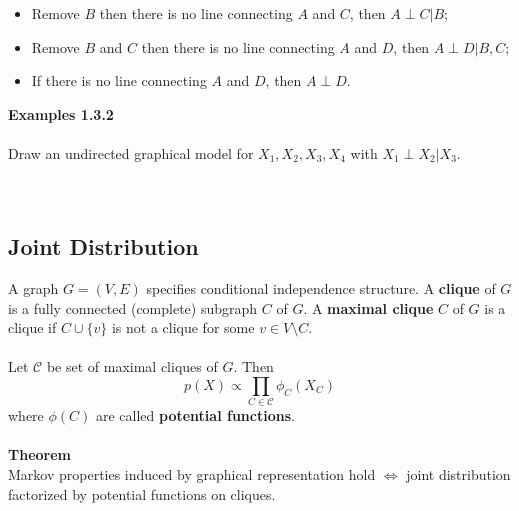 \documentclass[12pt]{book}
\theoremstyle{definition}
\theoremstyle{remark}
\begin{document}
\begin{notionbox}
    \begin{itemize}
        \item Remove $B$ then there is no line connecting $A$ and $C$, then $ A\perp C|B$;
        \item Remove $B$ and $C$ then there is no line connecting $A$ and $D$, then $ A\perp D|B, C$;
        \item If there is no line connecting $A$ and $D$, then $A\perp D$.
    \end{itemize}
\end{notionbox}



\textbf{Examples 1.3.2}\\
\\
Draw an undirected graphical model for $X_1, X_2, X_3, X_4$ with $X_1 \perp X_2 | X_3$.\\
\\
\\
\begin{center}
\end{center}

\subsection{Joint Distribution}
A graph $G = (V,E)$ specifies conditional independence structure. A \textbf{clique} of $G$ is a fully connected (complete) subgraph $C$ of $G$. A \textbf{maximal clique} $C$ of $G$ is a clique if $C \cup \{v\}$ is not a clique for some $v\in V \setminus C$.\\
\\
Let $\mathcal{C}$ be set of maximal cliques of $G$. Then 
\[p(X) \propto \prod_{C\in \mathcal{C}}\phi_C (X_C)\]
where $\phi(C)$ are called \textbf{potential functions}.\\
\\
\textbf{Theorem}\\
Markov properties induced by graphical representation hold $\Leftrightarrow$ joint distribution factorized by potential functions on cliques.\\
\\
\end{document}
